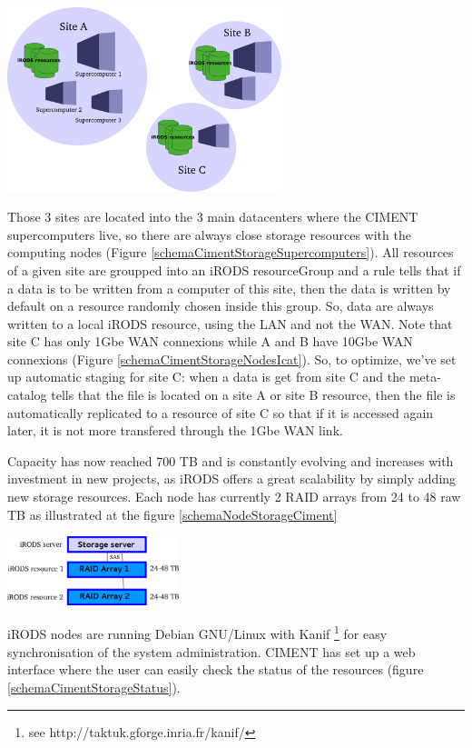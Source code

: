 \documentclass[a4paper, 10pt]{article}
\begin{document}
\begin{multicols}{2}
\begin{center}%
\centering
{}
\includegraphics[width=8cm]{schemaCimentStorageSupercomputers.png}
\end{center}
Those 3 sites are located into the 3 main datacenters where the CIMENT supercomputers live, so there are always close storage resources with the computing nodes (Figure \ref{schemaCimentStorageSupercomputers}). All resources of a given site are groupped into an iRODS resourceGroup and a rule tells that if a data is to be written from a computer of this site, then the data is written by default on a resource randomly chosen inside this group. So, data are always written to a local iRODS resource, using the LAN and not the WAN.
Note that site C has only 1Gbe WAN connexions while A and B have 10Gbe WAN connexions (Figure \ref{schemaCimentStorageNodesIcat}). So, to optimize, we've set up automatic staging for site C: when a data is get from site C and the meta-catalog tells that the file is located on a site A or site B resource, then the file is automatically replicated to a resource of site C so that if it is accessed again later, it is not more transfered through the 1Gbe WAN link. 

Capacity has now reached 700 TB and is constantly evolving and increases with investment in new projects, as iRODS offers a great scalability by simply adding new storage resources.
Each node has currently 2 RAID arrays from 24 to 48 raw TB as illustrated at the figure \ref{schemaNodeStorageCiment}

\begin{center}%
\centering
{}
\includegraphics[width=5cm]{schemaNodeStorageCiment.png}
\end{center}
iRODS nodes are running Debian GNU/Linux with Kanif \footnote{see http://taktuk.gforge.inria.fr/kanif/} \cite{key:CHR2009} for easy synchronisation of the system administration.
CIMENT has set up a web interface where the user can easily check the status of the resources (figure \ref{schemaCimentStorageStatus}).


\end{multicols}
\end{document}
